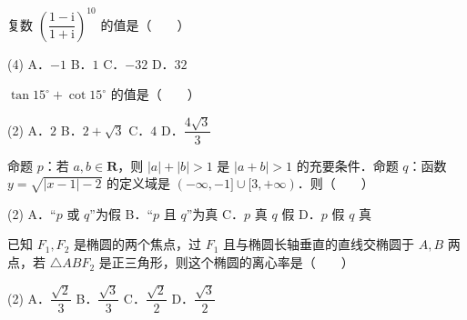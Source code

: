 

\begin{question}
复数 $\left(\dfrac{1-\mathrm{i}}{1+\mathrm{i}}\right)^{10}$ 的值是\mbox{（　　）}

\begin{gkopts}(4)
\task A．$-1$
\task B．$1$
\task C．$-32$
\task D．$32$
\end{gkopts}

\end{question}
\begin{question}
$\tan 15^\circ + \cot 15^\circ$ 的值是\mbox{（　　）}

\begin{gkopts}(2)
\task A．$2$
\task B．$2 + \sqrt{3}$
\task C．$4$
\task D．$\dfrac{4\sqrt{3}}{3}$
\end{gkopts}

\end{question}
\begin{question}
命题 $p$：若 $a, b \in \mathbf{R}$，则 $|a| + |b| > 1$ 是 $|a + b| > 1$ 的充要条件．命题 $q$：函数 $y = \sqrt{|x - 1| - 2}$ 的定义域是 $(-\infty, -1] \cup [3, +\infty)$．则\mbox{（　　）}

\begin{gkopts}(2)
\task A．“$p$ 或 $q$”为假
\task B．“$p$ 且 $q$”为真
\task C．$p$ 真 $q$ 假
\task D．$p$ 假 $q$ 真
\end{gkopts}

\end{question}
\begin{question}
已知 $F_1, F_2$ 是椭圆的两个焦点，过 $F_1$ 且与椭圆长轴垂直的直线交椭圆于 $A, B$ 两点，若 $\triangle ABF_2$ 是正三角形，则这个椭圆的离心率是\mbox{（　　）}

\begin{gkopts}(2)
\task A．$\dfrac{\sqrt{2}}{3}$
\task B．$\dfrac{\sqrt{3}}{3}$
\task C．$\dfrac{\sqrt{2}}{2}$
\task D．$\dfrac{\sqrt{3}}{2}$
\end{gkopts}

\end{question}
